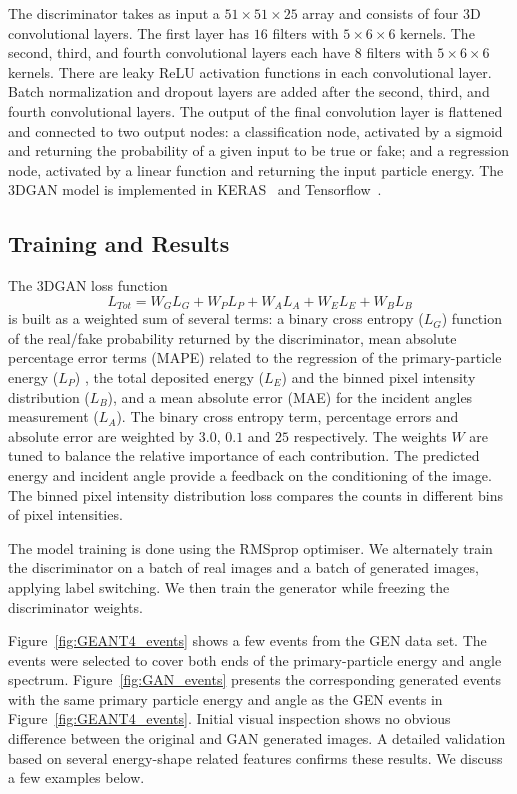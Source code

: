 The discriminator takes as input a $51  \times 51  \times 25$ array and consists of four 3D convolutional layers. The first layer has $16$ filters with $5 \times 6 \times 6$ kernels. The second, third, and fourth convolutional layers each have $8$ filters with $5 \times 6 \times 6$ kernels. There are leaky ReLU activation functions in each convolutional layer. Batch normalization and dropout layers are added after the second, third, and fourth convolutional layers. The output of the final convolution layer is flattened and connected to two output nodes: a classification node, activated by a sigmoid and returning the probability of a given input to be true or fake; and a regression node, activated by a linear function and returning the input particle energy.
The 3DGAN model is implemented in KERAS~\cite{keras} and Tensorflow~\cite{tensorflow2015-whitepaper}. 

\subsection{Training and Results}
The 3DGAN loss function
\begin{equation}
   L_{Tot}  = W_{G}L_{G} + W_{P}L_{P} + W_{A}L_{A} + W_{E}L_{E} + W_{B}L_{B} 
\label{eq:loss}
\end{equation}
is built as a weighted sum of several terms: a binary cross entropy ($L_{G}$) function of the real/fake probability returned by the discriminator, mean absolute percentage error terms (MAPE) related to the regression of the primary-particle energy ($L_{P}$) , the total deposited energy ($L_{E}$) and the binned pixel intensity distribution ($L_{B}$), and a mean absolute error (MAE) for the incident angles measurement ($L_{A}$). The binary cross entropy term, percentage errors and absolute error are weighted by $3.0$, $0.1$ and $25$ respectively. The weights $W$ are tuned to balance the relative importance of each contribution. The predicted energy and incident angle provide a feedback on the conditioning of the image. The binned pixel intensity distribution loss compares the counts in different bins of pixel intensities. 

The model training is done using the RMSprop \cite{rmsProp} optimiser. We alternately train the discriminator on a batch of real images and a batch of generated images, applying label switching. We then train the generator while freezing the discriminator weights.

Figure~\ref{fig:GEANT4_events} shows a few events from the GEN data set. The events were selected to cover both ends of the primary-particle energy and angle spectrum. Figure~\ref{fig:GAN_events} presents the corresponding generated events with the same primary particle energy and angle as the GEN events in Figure~\ref{fig:GEANT4_events}. Initial visual inspection shows no obvious difference between the original and GAN generated images. A detailed validation based on several energy-shape related features confirms these results. We discuss a few examples below.


